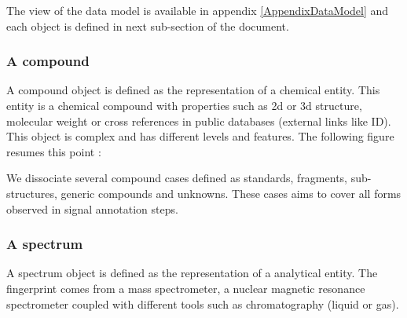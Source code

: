 The view of the data model is available in appendix \ref{AppendixDataModel} and each object is defined in next sub-section of the document.

\subsubsection{A compound}
\hspace*{\parindent}
A compound object is defined as the representation of a chemical entity. This entity is a chemical compound with properties such as 2d or 3d structure, molecular weight or cross references in public databases (external links like ID). This object is complex and has different levels and features. The following figure resumes this point :
	
\begin{figure}[htbp]
	\centering
\end{figure}

We dissociate several compound cases defined as standards, fragments, sub-structures, generic compounds and unknowns. These cases aims to cover all forms observed in signal annotation steps.


\subsubsection{A spectrum}

A spectrum object is defined as the representation of a analytical entity. The fingerprint comes from a mass spectrometer, a nuclear magnetic resonance spectrometer coupled with different tools such as chromatography (liquid or gas). 

